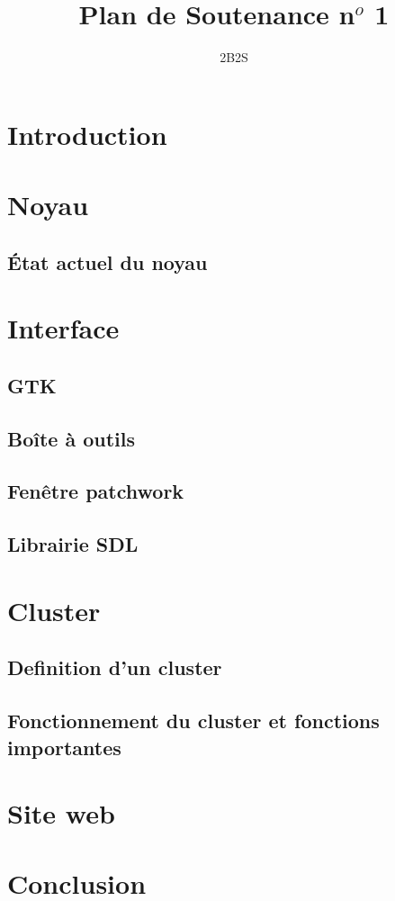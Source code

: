 \documentclass[14pt,a4paper]{article}
\title{\textbf{Plan de Soutenance n$^o$ 1}}
\author{2B2S}
\begin{document}
\maketitle
\rule{0cm}{1mm}
\section{Introduction}
\rule{0cm}{0cm}
\section{Noyau}
\subsection{\'Etat actuel du noyau}
\rule{0cm}{0cm}
\section{Interface}
\subsection{GTK}
\subsection{Bo\^ite \`a outils}
\subsection{Fen\^etre patchwork}
\subsection{Librairie SDL}
\rule{0cm}{0cm}
\section{Cluster}
\subsection{Definition d'un cluster}
\subsection{Fonctionnement du cluster et fonctions importantes}
\rule{0cm}{0cm}
\section{Site web}
\rule{0cm}{0cm}
\section{Conclusion}
\end{document}
